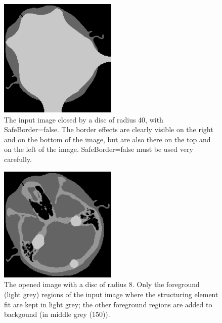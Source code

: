 \documentclass[IJ]{cesj}
\begin{document}
\begin{figure}
\centering
\includegraphics[width=0.5\textwidth]{close-unsafe.eps}
\caption{The input image closed by a disc of radius 40, with SafeBorder=false. The border effects are clearly visible on the right and on the bottom of the image, but are also there on the top and on the left of the image. SafeBorder=false must be used very carefully.\label{unsafe}}
\end{figure}

\begin{figure}
\centering
\includegraphics[width=0.5\textwidth]{open.eps}
\caption{The opened image with a disc of radius 8. Only the foreground (light grey) regions of the input image where the structuring element fit are kept in light grey; the other foreground regions are added to backgound (in middle grey (150)).\label{open}}
\end{figure}
\end{document}
